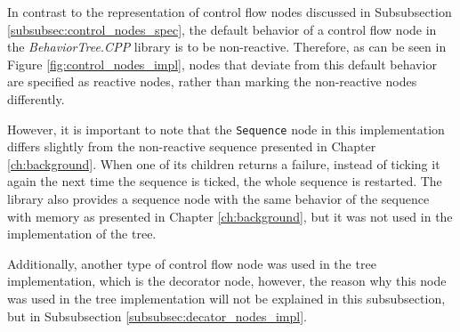 In contrast to the representation of control flow nodes discussed in Subsubsection \ref{subsubsec:control_nodes_spec}, the default behavior of a control flow node in the \textit{BehaviorTree.CPP} library is to be non-reactive. Therefore, as can be seen in Figure \ref{fig:control_nodes_impl}, nodes that deviate from this default behavior are specified as reactive nodes, rather than marking the non-reactive nodes differently. 

However, it is important to note that the \texttt{Sequence} node in this implementation differs slightly from the non-reactive sequence presented in Chapter \ref{ch:background}. When one of its children returns a failure, instead of ticking it again the next time the sequence is ticked, the whole sequence is restarted. The library also provides a sequence node with the same behavior of the sequence with memory as presented in Chapter \ref{ch:background}, but it was not used in the implementation of the tree. 

Additionally, another type of control flow node was used in the tree implementation, which is the decorator node, however, the reason why this node was used in the tree implementation will not be explained in this subsubsection, but in Subsubsection \ref{subsubsec:decator_nodes_impl}.

